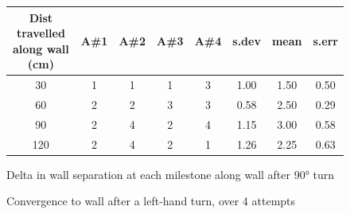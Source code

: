 \documentclass[a4paper,12pt]{article}
\begin{document}
\begin{figure}[ht]
\begin{tabular}{c c c c c c c c} %
\hline\hline %
Dist travelled along wall (cm) & A\#1 & A\#2 & A\#3 & A\#4 & s.dev & mean & s.err \\ [0.5ex] %
\hline %
30 & 1 & 1 & 1 & 3 & 1.00 & 1.50 & 0.50\\
60 & 2 & 2 & 3 & 3 & 0.58 & 2.50 & 0.29\\
90 & 2 & 4 & 2 & 4 & 1.15 & 3.00 & 0.58\\
120 & 2 & 4 & 2 & 1 & 1.26 & 2.25 & 0.63\\ [1ex] %
\hline %
\end{tabular}
\caption{Delta in wall separation at each milestone along wall after \ang{90} turn}
\label{fig:deriv90}
\end{figure}



\begin{figure}[ht]
\caption{Convergence to wall after a left-hand turn, over 4 attempts}
\label{fig:turnm90}
\end{figure}
\end{document}
